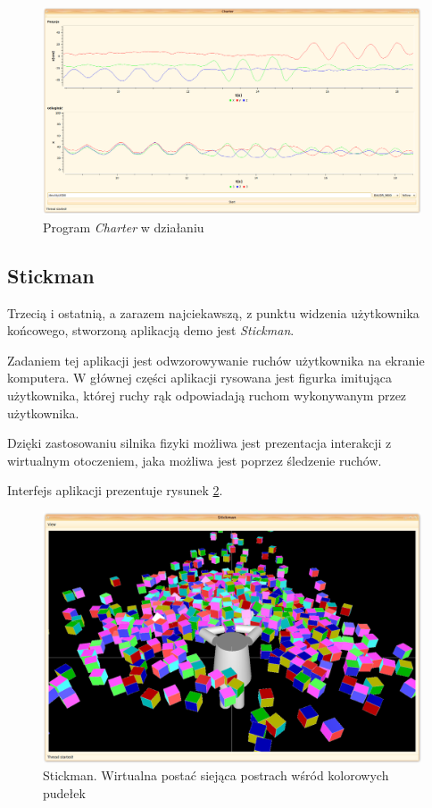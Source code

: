 \begin{figure}
  \includegraphics[width=\textwidth]{gfx/charter.png}
  \caption{Program \textsl{Charter} w działaniu}
  \label{fig:charter}
\end{figure}


\subsection{Stickman}
\label{sec:app_stickman}
Trzecią i ostatnią, a zarazem najciekawszą, z punktu widzenia użytkownika końcowego, stworzoną aplikacją demo jest \textsl{Stickman}.

Zadaniem tej aplikacji jest odwzorowywanie ruchów użytkownika na ekranie komputera. W głównej części aplikacji rysowana jest figurka imitująca użytkownika, której ruchy rąk odpowiadają ruchom wykonywanym przez użytkownika.

Dzięki zastosowaniu silnika fizyki możliwa jest prezentacja interakcji z wirtualnym otoczeniem, jaka możliwa jest poprzez śledzenie ruchów.

Interfejs aplikacji prezentuje rysunek \ref{fig:stickman}.

\begin{figure}
  \includegraphics[width=\textwidth]{gfx/stickman.png}
  \caption[Stickman]{Stickman. Wirtualna postać siejąca postrach wśród kolorowych pudełek}
  \label{fig:stickman}
\end{figure}


